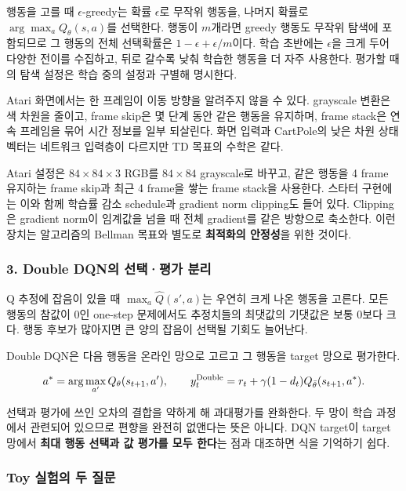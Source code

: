 \documentclass[11pt,a4paper]{article}
\begin{document}
행동을 고를 때 $\epsilon$-greedy는 확률 $\epsilon$로 무작위 행동을, 나머지 확률로 $\arg\max_a Q_\theta(s,a)$를 선택한다. 행동이 $m$개라면 greedy 행동도 무작위 탐색에 포함되므로 그 행동의 전체 선택확률은 $1-\epsilon+\epsilon/m$이다. 학습 초반에는 $\epsilon$을 크게 두어 다양한 전이를 수집하고, 뒤로 갈수록 낮춰 학습한 행동을 더 자주 사용한다. 평가할 때의 탐색 설정은 학습 중의 설정과 구별해 명시한다.\par

Atari 화면에서는 한 프레임이 이동 방향을 알려주지 않을 수 있다. grayscale 변환은 색 차원을 줄이고, frame skip은 몇 단계 동안 같은 행동을 유지하며, frame stack은 연속 프레임을 묶어 시간 정보를 일부 되살린다. 화면 입력과 CartPole의 낮은 차원 상태 벡터는 네트워크 입력층이 다르지만 TD 목표의 수학은 같다.\par

Atari 설정은 $84\times84\times3$ RGB를 $84\times84$ grayscale로 바꾸고, 같은 행동을 4 frame 유지하는 frame skip과 최근 4 frame을 쌓는 frame stack을 사용한다. 스타터 구현에는 이와 함께 학습률 감소 schedule과 gradient norm clipping도 들어 있다. Clipping은 gradient norm이 임계값을 넘을 때 전체 gradient를 같은 방향으로 축소한다. 이런 장치는 알고리즘의 Bellman 목표와 별도로 \textbf{최적화의 안정성}을 위한 것이다.\par

\subsubsection{3. Double DQN의 선택·평가 분리}

Q 추정에 잡음이 있을 때 $\max_a \hat Q(s',a)$는 우연히 크게 나온 행동을 고른다. 모든 행동의 참값이 0인 one-step 문제에서도 추정치들의 최댓값의 기댓값은 보통 0보다 크다. 행동 후보가 많아지면 큰 양의 잡음이 선택될 기회도 늘어난다.\par

Double DQN은 다음 행동을 온라인 망으로 고르고 그 행동을 target 망으로 평가한다.\par

\[
a^*=\arg\max_{a'}Q_\theta(s_{t+1},a'),\qquad
y_t^{\rm Double}=r_t+\gamma(1-d_t)Q_{\bar\theta}(s_{t+1},a^*).
\]

선택과 평가에 쓰인 오차의 결합을 약하게 해 과대평가를 완화한다. 두 망이 학습 과정에서 관련되어 있으므로 편향을 완전히 없앤다는 뜻은 아니다. DQN target이 target 망에서 \textbf{최대 행동 선택과 값 평가를 모두 한다}는 점과 대조하면 식을 기억하기 쉽다.\par

\subsubsection{Toy 실험의 두 질문}
\end{document}
